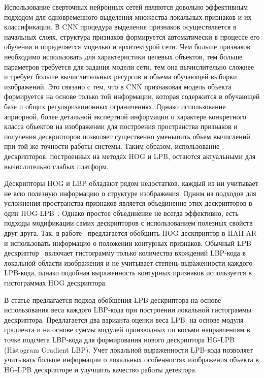 \documentclass[12pt,twoside]{article}
\begin{document}
Использование сверточных нейронных сетей являются довольно эффективным подходом для одновременного выделения множества локальных признаков и их классификации. В CNN процедура выделения признаков осуществляется в начальных слоях, структура признаков формируется автоматически в процессе его обучения и определяется моделью и архитектурой сети. Чем больше признаков необходимо использовать для характеристики целевых объектов, тем больше параметров требуется для задания модели сети, тем она вычислительно сложнее и требует больше вычислительных ресурсов и объема обучающей выборки изображений. Это связано с тем, что в CNN признаковая модель объекта формируется на основе только той информации, которая содержится в обучающей базе и общих регуляризационных ограничениях. Однако использование априорной, более детальной экспертной информации о характере конкретного класса объектов на изображении для построения пространства признаков и получения дескрипторов позволяет существенно уменьшить объем вычислений при той же точности работы системы. Таким образом, использование дескрипторов, построенных на методах HOG и LPB, остаются актуальными для вычислительно слабых платформ.

Дескрипторы HOG и LBP обладают рядом недостатков, каждый из ни учитывает не всю полезную информацию о структуре изображения. Одним из подходов для усложнения пространства признаков является объединение этих дескрипторов в один HOG-LPB~\cite{Wang09}. Однако простое объединение не всегда эффективно, есть подходы модификации самих дескрипторов с использованием полезных свойств друг друга. Так, в работе~\cite{Samsonov17} предлагается обобщить HOG дескприптор в HAH-AR и использовать информацио о положении контурных признаков. Обычный LPB дескриптор~\cite{Ojala02} включает гистограмму только количества вхождений LBP-кода в локальной области изображения и не учитывает степень выраженности каждого LPB-кода, однако подобная выраженность контурных признаков используется в гистограммах HOG дескриптора.

В статье предлагается подход обобщения LPB дескриптора на основе использования веса каждого LBP-кода при построении локальной гистограммы дескриптора. Предлагается два варианта оценки веса LPB: на основе модуля градиента и на основе суммы модулей производных по восьми направлениям в точке подсчета LBP-кода для формирования нового дескриптора HG-LPB (Histogram Gradient LBP). Учет локальной выраженности LPB-кода позволяет учитывать больше информации о локальных особенностях изображения объекта в HG-LPB дескрипторе и улучшить качество работы детектора.
\end{document}
